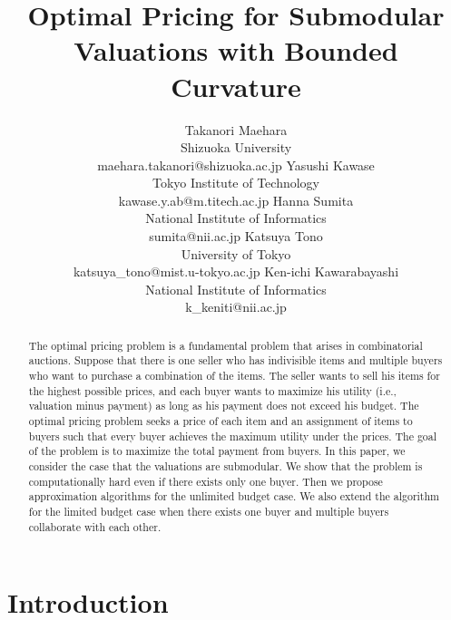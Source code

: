 \documentclass[letterpaper]{article}
\theoremstyle{definition}
\begin{document}
\title{Optimal Pricing for Submodular Valuations with Bounded Curvature}
\author{
Takanori Maehara\\
Shizuoka University \\
maehara.takanori@shizuoka.ac.jp
\And
Yasushi Kawase \\
Tokyo Institute of Technology \\
kawase.y.ab@m.titech.ac.jp
\AND
Hanna Sumita \\
National Institute of Informatics \\
sumita@nii.ac.jp
\And
Katsuya Tono \\
University of Tokyo \\
katsuya\_tono@mist.u-tokyo.ac.jp
\And
Ken-ichi Kawarabayashi \\
National Institute of Informatics \\
k\_keniti@nii.ac.jp
}
\nocopyright
\maketitle

\begin{abstract}
The optimal pricing problem is a fundamental problem that arises in combinatorial auctions.
Suppose that there is one seller who has indivisible items and multiple buyers who want to purchase a combination of the items.
The seller wants to sell his items for the highest possible prices,
and each buyer wants to maximize his utility (i.e., valuation minus payment) as long as his payment does not exceed his budget.
The optimal pricing problem seeks a price of each item and an assignment of items to buyers such that every buyer achieves the maximum utility under the prices.
The goal of the problem is to maximize the total payment from buyers.
In this paper, we consider the case that the valuations are submodular.
We show that the problem is computationally hard even if there exists only one buyer.
Then we propose approximation algorithms for the unlimited budget case.
We also extend the algorithm for the limited budget case when there exists one buyer and multiple buyers collaborate with each other.
\end{abstract}


\section{Introduction}
\label{sec:introduction}
\end{document}
